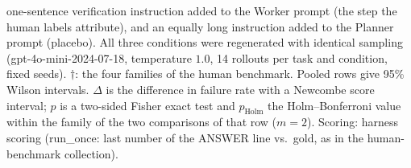 \begin{table}[t]
{one-sentence verification instruction added to the Worker prompt (the step the human labels
attribute), and an equally long instruction added to the Planner prompt (placebo). All three
conditions were regenerated with identical sampling (gpt-4o-mini-2024-07-18, temperature $1.0$,
14 rollouts per task and condition, fixed seeds).
$\dagger$: the four families of the human benchmark. Pooled rows give 95\% Wilson intervals.
$\Delta$ is the difference in failure rate with a Newcombe score interval; $p$ is a two-sided
Fisher exact test and $p_{\mathrm{Holm}}$ the Holm--Bonferroni value within the family of the two
comparisons of that row ($m{=}2$). Scoring: harness scoring (run\_once: last number of the ANSWER line vs.\ gold, as in the human-benchmark collection).}
\label{tab:intervention}
\end{table}

